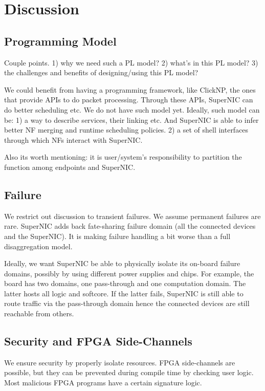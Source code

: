 \section{Discussion}

\subsection{Programming Model}
Couple points.
1) why we need such a PL model?
2) what's in this PL model?
3) the challenges and benefits of designing/using this PL model?

We could benefit from having a programming framework, like ClickNP, the ones
that provide APIs to do packet processing. Through these APIs,
SuperNIC can do better scheduling etc.
We do not have such model yet.
Ideally, such model can be:
1) a way to describe services, their linking etc.
And SuperNIC is able to infer better NF merging and runtime scheduling policies.
2) a set of shell interfaces through which NFs interact with SuperNIC.

Also its worth mentioning: it is user/system's responsibility to partition
the function among endpoints and SuperNIC. 

\subsection{Failure}

We restrict out discussion to transient failures.
We assume permanent failures are rare.
SuperNIC adds back fate-sharing failure domain (all the connected devices and the SuperNIC). It is making failure handling a bit worse than a full disaggregation model.

Ideally, we want SuperNIC be able to physically isolate its on-board
failure domains, possibly by using different power supplies and chips.
For example, the board has two domains, one pass-through and one computation domain.
The latter hosts all logic and softcore.
If the latter fails, SuperNIC is still able to route traffic via the pass-through domain hence the connected
devices are still reachable from others.

\subsection{Security and FPGA Side-Channels}

We ensure security by properly isolate resources.
FPGA side-channels are possible, but they can be prevented
during compile time by checking user logic.
Most malicious FPGA programs have a certain signature logic.
